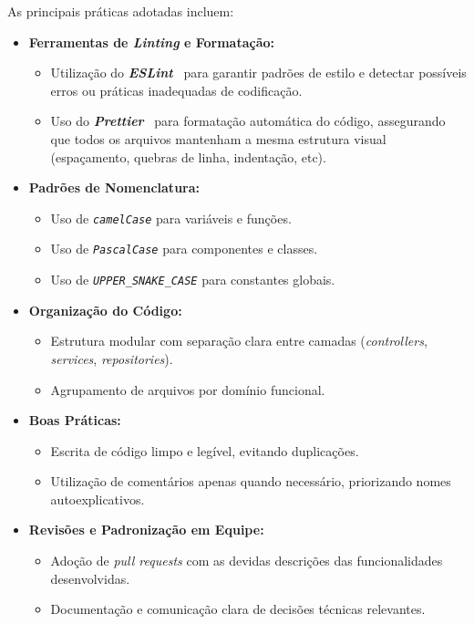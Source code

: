 As principais práticas adotadas incluem:

\begin{itemize}
  \item \textbf{Ferramentas de \textit{Linting} e Formatação:}
  \begin{itemize}
    \item Utilização do \textbf{\textit{ESLint}}~\cite{eslint-2025} para garantir padrões de estilo e detectar possíveis erros ou práticas inadequadas de codificação.
    \item Uso do \textbf{\textit{Prettier}}~\cite{prettier-2025} para formatação automática do código, assegurando que todos os arquivos mantenham a mesma estrutura visual (espaçamento, quebras de linha, indentação, etc).
  \end{itemize}

  \item \textbf{Padrões de Nomenclatura:}
  \begin{itemize}
    \item Uso de \textit{\texttt{camelCase}} para variáveis e funções.
    \item Uso de \textit{\texttt{PascalCase}} para componentes e classes.
    \item Uso de \textit{\texttt{UPPER\_SNAKE\_CASE}} para constantes globais.
  \end{itemize}

  \item \textbf{Organização do Código:}
  \begin{itemize}
    \item Estrutura modular com separação clara entre camadas (\textit{controllers}, \textit{services}, \textit{repositories}).
    \item Agrupamento de arquivos por domínio funcional.
  \end{itemize}

  \item \textbf{Boas Práticas:}
  \begin{itemize}
    \item Escrita de código limpo e legível, evitando duplicações.
    \item Utilização de comentários apenas quando necessário, priorizando nomes autoexplicativos.
  \end{itemize}

  \item \textbf{Revisões e Padronização em Equipe:}
  \begin{itemize}
    \item Adoção de \textit{pull requests} com as devidas descrições das funcionalidades desenvolvidas.
    \item Documentação e comunicação clara de decisões técnicas relevantes.
  \end{itemize}
\end{itemize}

